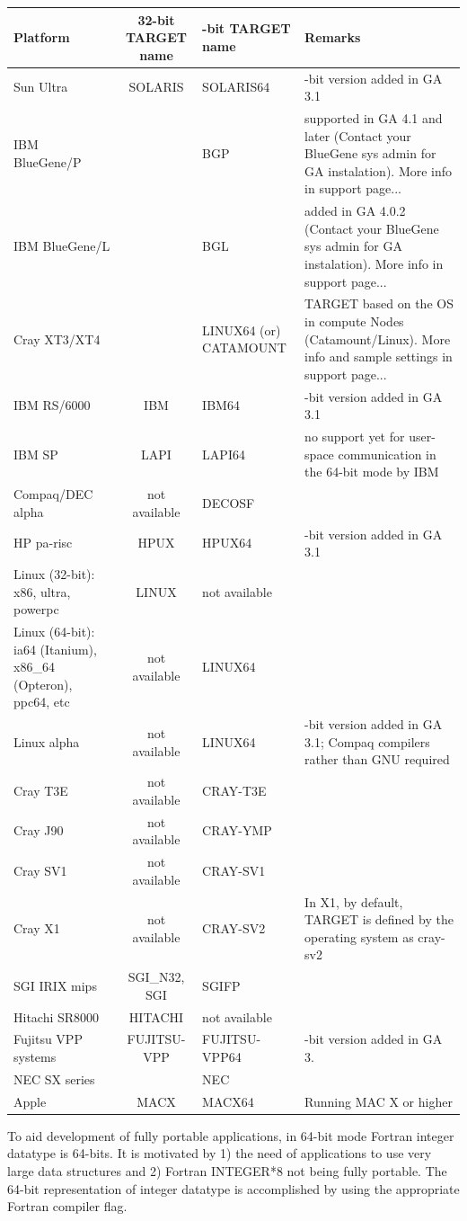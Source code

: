 \begin{longtable}{|>{\centering}p{3cm}|c|>{\centering}p{3cm}|>{\centering}p{3cm}|}
\hline 
Platform & 32-bit TARGET name & 64-bit TARGET name & Remarks\tabularnewline
\hline
\endhead
\hline 
Sun Ultra & SOLARIS & SOLARIS64 & 64-bit version added in GA 3.1\tabularnewline
\hline 
IBM BlueGene/P &  & BGP & supported in GA 4.1 and later (Contact your BlueGene sys admin for
GA instalation). More info in support page...\tabularnewline
\hline 
IBM BlueGene/L &  & BGL & added in GA 4.0.2 (Contact your BlueGene sys admin for GA instalation).
More info in support page...\tabularnewline
\hline 
Cray XT3/XT4 &  & LINUX64 (or) CATAMOUNT & TARGET based on the OS in compute Nodes (Catamount/Linux). More info
and sample settings in support page...\tabularnewline
\hline 
IBM RS/6000 & IBM & IBM64 & 64-bit version added in GA 3.1\tabularnewline
\hline 
IBM SP & LAPI & LAPI64 & no support yet for user-space communication in the 64-bit mode by
IBM\tabularnewline
\hline 
Compaq/DEC alpha & not available & DECOSF & \tabularnewline
\hline 
HP pa-risc & HPUX & HPUX64 & 64-bit version added in GA 3.1\tabularnewline
\hline 
Linux (32-bit): x86, ultra, powerpc & LINUX & not available & \tabularnewline
\hline 
Linux (64-bit): ia64 (Itanium), x86\_64 (Opteron), ppc64, etc & not available & LINUX64 & \tabularnewline
\hline 
Linux alpha & not available & LINUX64 & 64-bit version added in GA 3.1; Compaq compilers rather than GNU required\tabularnewline
\hline 
Cray T3E & not available & CRAY-T3E & \tabularnewline
\hline 
Cray J90 & not available & CRAY-YMP & \tabularnewline
\hline 
Cray SV1 & not available & CRAY-SV1 & \tabularnewline
\hline 
Cray X1 & not available & CRAY-SV2 & In X1, by default, TARGET is defined by the operating system as cray-sv2\tabularnewline
\hline 
SGI IRIX mips & SGI\_N32, SGI & SGIFP & \tabularnewline
\hline 
Hitachi SR8000 & HITACHI & not available & \tabularnewline
\hline 
Fujitsu VPP systems & FUJITSU-VPP & FUJITSU-VPP64 & 64-bit version added in GA 3.\tabularnewline
\hline 
NEC SX series &  & NEC & \tabularnewline
\hline 
Apple & MACX & MACX64 & Running MAC X or higher\tabularnewline
\hline
\end{longtable}

To aid development of fully portable applications, in 64-bit mode
Fortran integer datatype is 64-bits. It is motivated by 1) the need
of applications to use very large data structures and 2) Fortran INTEGER{*}8
not being fully portable. The 64-bit representation of integer datatype
is accomplished by using the appropriate Fortran compiler flag.

